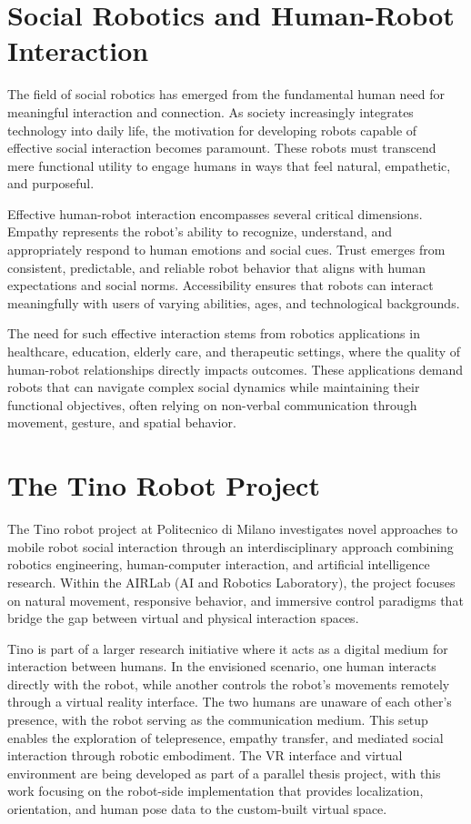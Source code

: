 \section{Social Robotics and Human-Robot Interaction}
The field of social robotics has emerged from the fundamental human need for meaningful interaction and connection. As society increasingly integrates technology into daily life, the motivation for developing robots capable of effective social interaction becomes paramount. These robots must transcend mere functional utility to engage humans in ways that feel natural, empathetic, and purposeful.

Effective human-robot interaction encompasses several critical dimensions. Empathy represents the robot's ability to recognize, understand, and appropriately respond to human emotions and social cues. Trust emerges from consistent, predictable, and reliable robot behavior that aligns with human expectations and social norms. Accessibility ensures that robots can interact meaningfully with users of varying abilities, ages, and technological backgrounds.

The need for such effective interaction stems from robotics applications in healthcare, education, elderly care, and therapeutic settings, where the quality of human-robot relationships directly impacts outcomes. These applications demand robots that can navigate complex social dynamics while maintaining their functional objectives, often relying on non-verbal communication through movement, gesture, and spatial behavior.

\section{The Tino Robot Project}
The Tino robot project at Politecnico di Milano investigates novel approaches to mobile robot social interaction through an interdisciplinary approach combining robotics engineering, human-computer interaction, and artificial intelligence research. Within the AIRLab (AI and Robotics Laboratory), the project focuses on natural movement, responsive behavior, and immersive control paradigms that bridge the gap between virtual and physical interaction spaces.

Tino is part of a larger research initiative where it acts as a digital medium for interaction between humans. In the envisioned scenario, one human interacts directly with the robot, while another controls the robot's movements remotely through a virtual reality interface. The two humans are unaware of each other's presence, with the robot serving as the communication medium. This setup enables the exploration of telepresence, empathy transfer, and mediated social interaction through robotic embodiment. The VR interface and virtual environment are being developed as part of a parallel thesis project, with this work focusing on the robot-side implementation that provides localization, orientation, and human pose data to the custom-built virtual space.

